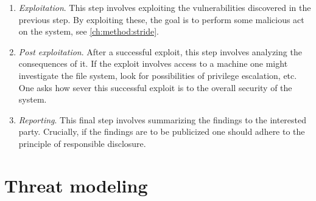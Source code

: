\begin{enumerate}
    \item \textit{Exploitation}. This step involves exploiting the vulnerabilities discovered in the previous step. By exploiting these, the goal is to perform some malicious act on the system, see \ref{ch:method:stride}.
    \item \textit{Post exploitation}. After a successful exploit, this step involves analyzing the consequences of it. If the exploit involves access to a machine one might investigate the file system, look for possibilities of privilege escalation, etc. One asks how sever this successful exploit is to the overall security of the system.
    \item \textit{Reporting}. This final step involves summarizing the findings to the interested party. Crucially, if the findings are to be publicized one should adhere to the principle of responsible disclosure.
\end{enumerate}

\section{Threat modeling} \label{ch:method:threat-modeling}

